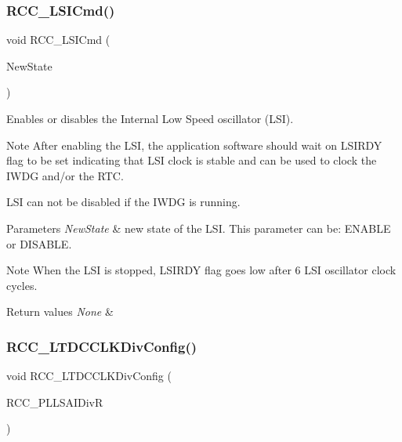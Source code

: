 \subsubsection{\texorpdfstring{R\+C\+C\+\_\+\+L\+S\+I\+Cmd()}{RCC\_LSICmd()}}
{\footnotesize\ttfamily void R\+C\+C\+\_\+\+L\+S\+I\+Cmd (\begin{DoxyParamCaption}\item[{Functional\+State}]{New\+State }\end{DoxyParamCaption})}



Enables or disables the Internal Low Speed oscillator (L\+SI). 

\begin{DoxyNote}{Note}
After enabling the L\+SI, the application software should wait on L\+S\+I\+R\+DY flag to be set indicating that L\+SI clock is stable and can be used to clock the I\+W\+DG and/or the R\+TC. 

L\+SI can not be disabled if the I\+W\+DG is running. ~\newline

\end{DoxyNote}

\begin{DoxyParams}{Parameters}
{\em New\+State} & new state of the L\+SI. This parameter can be\+: E\+N\+A\+B\+LE or D\+I\+S\+A\+B\+LE. \\
\hline
\end{DoxyParams}
\begin{DoxyNote}{Note}
When the L\+SI is stopped, L\+S\+I\+R\+DY flag goes low after 6 L\+SI oscillator clock cycles. 
\end{DoxyNote}

\begin{DoxyRetVals}{Return values}
{\em None} & \\
\hline
\end{DoxyRetVals}
\mbox{\label{group___r_c_c_gac04a91996aefd2a517cf90c2a44830d2}} 
\subsubsection{\texorpdfstring{R\+C\+C\+\_\+\+L\+T\+D\+C\+C\+L\+K\+Div\+Config()}{RCC\_LTDCCLKDivConfig()}}
{\footnotesize\ttfamily void R\+C\+C\+\_\+\+L\+T\+D\+C\+C\+L\+K\+Div\+Config (\begin{DoxyParamCaption}\item[{uint32\+\_\+t}]{R\+C\+C\+\_\+\+P\+L\+L\+S\+A\+I\+DivR }\end{DoxyParamCaption})}




